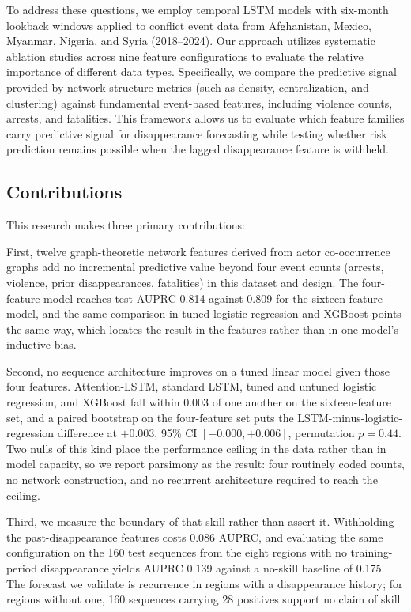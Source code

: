 \documentclass[pdflatex,sn-mathphys-num]{sn-jnl}%
\theoremstyle{thmstyleone}%
\theoremstyle{thmstyletwo}%
\theoremstyle{thmstylethree}%
\begin{document}
To address these questions, we employ temporal LSTM models with six-month lookback windows applied to conflict event data from Afghanistan, Mexico, Myanmar, Nigeria, and Syria (2018--2024). Our approach utilizes systematic ablation studies across nine feature configurations to evaluate the relative importance of different data types. Specifically, we compare the predictive signal provided by network structure metrics (such as density, centralization, and clustering) against fundamental event-based features, including violence counts, arrests, and fatalities. This framework allows us to evaluate which feature families carry predictive signal for disappearance forecasting while testing whether risk prediction remains possible when the lagged disappearance feature is withheld.

\subsection{Contributions}
This research makes three primary contributions:

First, twelve graph-theoretic network features derived from actor co-occurrence graphs add no incremental predictive value beyond four event counts (arrests, violence, prior disappearances, fatalities) in this dataset and design. The four-feature model reaches test AUPRC 0.814 against 0.809 for the sixteen-feature model, and the same comparison in tuned logistic regression and XGBoost points the same way, which locates the result in the features rather than in one model's inductive bias.

Second, no sequence architecture improves on a tuned linear model given those four features. Attention-LSTM, standard LSTM, tuned and untuned logistic regression, and XGBoost fall within 0.003 of one another on the sixteen-feature set, and a paired bootstrap on the four-feature set puts the LSTM-minus-logistic-regression difference at $+0.003$, 95\% CI $[-0.000, +0.006]$, permutation $p = 0.44$. Two nulls of this kind place the performance ceiling in the data rather than in model capacity, so we report parsimony as the result: four routinely coded counts, no network construction, and no recurrent architecture required to reach the ceiling.

Third, we measure the boundary of that skill rather than assert it. Withholding the past-disappearance features costs 0.086 AUPRC, and evaluating the same configuration on the 160 test sequences from the eight regions with no training-period disappearance yields AUPRC 0.139 against a no-skill baseline of 0.175. The forecast we validate is recurrence in regions with a disappearance history; for regions without one, 160 sequences carrying 28 positives support no claim of skill.
\end{document}
